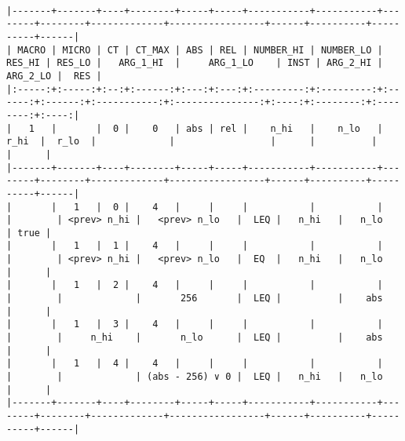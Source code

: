 \documentclass[varwidth=\maxdimen,margin=0.5cm,multi={verbatim}]{standalone}
\begin{document}
\begin{verbatim}

|-------+-------+----+--------+-----+-----+-----------+-----------+--------+--------+-------------+-----------------+------+----------+----------+------|
| MACRO | MICRO | CT | CT_MAX | ABS | REL | NUMBER_HI | NUMBER_LO | RES_HI | RES_LO |   ARG_1_HI  |     ARG_1_LO    | INST | ARG_2_HI | ARG_2_LO |  RES |
|:-----:+:-----:+:--:+:------:+:---:+:---:+:---------:+:---------:+:------:+:------:+:-----------:+:---------------:+:----:+:--------:+:--------:+:----:|
|   1   |       |  0 |    0   | abs | rel |    n_hi   |    n_lo   |  r_hi  |  r_lo  |             |                 |      |          |          |      |
|-------+-------+----+--------+-----+-----+-----------+-----------+--------+--------+-------------+-----------------+------+----------+----------+------|
|       |   1   |  0 |    4   |     |     |           |           |        |        | <prev> n_hi |   <prev> n_lo   |  LEQ |   n_hi   |   n_lo   | true |
|       |   1   |  1 |    4   |     |     |           |           |        |        | <prev> n_hi |   <prev> n_lo   |  EQ  |   n_hi   |   n_lo   |      |
|       |   1   |  2 |    4   |     |     |           |           |        |        |             |       256       |  LEQ |          |    abs   |      |
|       |   1   |  3 |    4   |     |     |           |           |        |        |     n_hi    |       n_lo      |  LEQ |          |    abs   |      |
|       |   1   |  4 |    4   |     |     |           |           |        |        |             | (abs - 256) ∨ 0 |  LEQ |   n_hi   |   n_lo   |      |
|-------+-------+----+--------+-----+-----+-----------+-----------+--------+--------+-------------+-----------------+------+----------+----------+------|

\end{verbatim}
\end{document}
